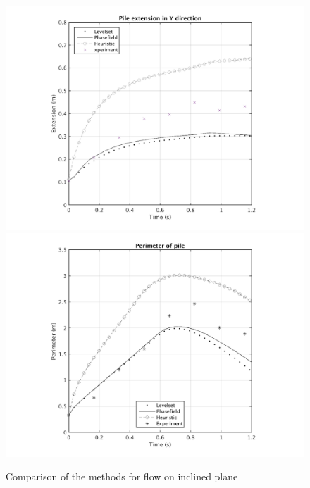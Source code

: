 \documentclass[letterpaper,10pt]{article}
\begin{document}
\begin{figure}[H]
\begin{minipage}[b]{.5\linewidth}
                  \label{area}
        \end{minipage}
        \begin{minipage}[b]{.5 \linewidth}
                \centering
                \includegraphics[scale=0.45]{IMAGES/yextend.png}
                  \label{y_extent}
                \includegraphics[scale=0.45]{IMAGES/perimeter.png}
                  \label{Perimeter}
        \end{minipage}
        \caption{Comparison of the methods for flow on inclined plane}
        \label{compinc_inclined}
\end{figure}
\end{document}
